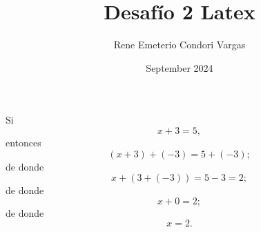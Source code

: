 \documentclass{article}
\title{Desafío 2 Latex}
\author{Rene Emeterio Condori Vargas}
\date{September 2024}
\begin{document}
Si  \[ x + 3 = 5, \]
entonces 
\[(x + 3) + (-3) = 5 + (-3);\]
de donde 
\[x + (3 + (-3)) = 5 - 3 = 2;\]
de donde 
\[x + 0 = 2;\]
de donde 
\[x = 2.\]
\end{document}
